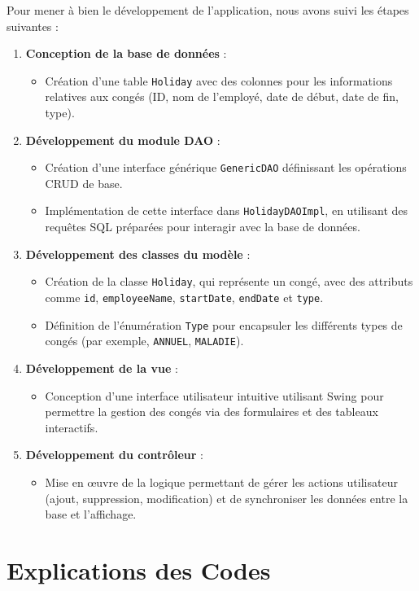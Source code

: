 \documentclass[a4paper,12pt]{article}
\begin{document}
Pour mener à bien le développement de l'application, nous avons suivi les étapes suivantes : \begin{enumerate} \item \textbf{Conception de la base de données} : \begin{itemize} \item Création d'une table \texttt{Holiday} avec des colonnes pour les informations relatives aux congés (ID, nom de l'employé, date de début, date de fin, type). \end{itemize} \item \textbf{Développement du module DAO} : \begin{itemize} \item Création d'une interface générique \texttt{GenericDAO} définissant les opérations CRUD de base. \item Implémentation de cette interface dans \texttt{HolidayDAOImpl}, en utilisant des requêtes SQL préparées pour interagir avec la base de données. \end{itemize} \item \textbf{Développement des classes du modèle} : \begin{itemize} \item Création de la classe \texttt{Holiday}, qui représente un congé, avec des attributs comme \texttt{id}, \texttt{employeeName}, \texttt{startDate}, \texttt{endDate} et \texttt{type}. \item Définition de l'énumération \texttt{Type} pour encapsuler les différents types de congés (par exemple, \texttt{ANNUEL}, \texttt{MALADIE}). \end{itemize} \item \textbf{Développement de la vue} : \begin{itemize} \item Conception d'une interface utilisateur intuitive utilisant Swing pour permettre la gestion des congés via des formulaires et des tableaux interactifs. \end{itemize} \item \textbf{Développement du contrôleur} : \begin{itemize} \item Mise en œuvre de la logique permettant de gérer les actions utilisateur (ajout, suppression, modification) et de synchroniser les données entre la base et l'affichage. \end{itemize} \end{enumerate}

\section{Explications des Codes}
\end{document}
